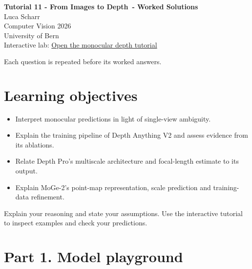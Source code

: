 \documentclass[11pt,a4paper]{article}
\newcommand{\laburl}{https://sosekie.github.io/Unibe-CVG-CV-Interactive-Labs/tutorial-11/}
\begin{document}
\begin{center}
{\Large\bfseries Tutorial 11 - From Images to Depth\ifsolutions\ - Worked Solutions\fi}\\[2mm]
Luca Scharr\\
Computer Vision 2026\\
University of Bern\\[1mm]
Interactive lab: \href{\laburl}{Open the monocular depth tutorial}
\end{center}
\ifsolutions
Each question is repeated before its worked answers.
\else
\section*{Learning objectives}
\begin{itemize}[nosep]
\item Interpret monocular predictions in light of single-view ambiguity.
\item Explain the training pipeline of Depth Anything V2 and assess evidence from its ablations.
\item Relate Depth Pro's multiscale architecture and focal-length estimate to its output.
\item Explain MoGe-2's point-map representation, scale prediction and training-data refinement.
\end{itemize}
Explain your reasoning and state your assumptions.
Use the interactive tutorial to inspect examples and check your predictions.
\fi
{}
\section*{Part 1. Model playground}
\end{document}
